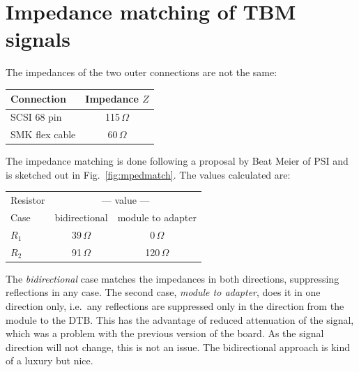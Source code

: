 \section{Impedance matching of TBM signals}

The impedances of the two outer connections are not the same:
\begin{center}
\begin{tabular}{lc}
    \toprule %
    Connection & Impedance $Z$ \\
    \midrule %
    SCSI 68 pin & 115\,$\Omega$ \\
    SMK flex cable & 60\,$\Omega$ \\
    \bottomrule %
\end{tabular}
\end{center}

The impedance matching is done following a proposal by Beat Meier of PSI and is sketched out in Fig.~\ref{fig:mpedmatch}. The values calculated are:
\begin{center}
\begin{tabular}{lcc}
    \toprule %
    Resistor & \multicolumn{2}{c}{--- value ---} \\
    Case & bidirectional & module to adapter \\
    \midrule %
    $R_1$ & 39\,$\Omega$ & 0\,$\Omega$ \\
    $R_2$ & 91\,$\Omega$ & 120\,$\Omega$ \\
    \bottomrule %
\end{tabular}
\end{center}
The \emph{bidirectional} case matches the impedances in both directions, suppressing reflections in any case. The second case, \emph{module to adapter}, does it in one direction only, i.e.~any reflections are suppressed only in the direction from the module to the DTB. This has the advantage of reduced attenuation of the signal, which was a problem with the previous version of the board. As the signal direction will not change, this is not an issue. The bidirectional approach is kind of a luxury but nice.

